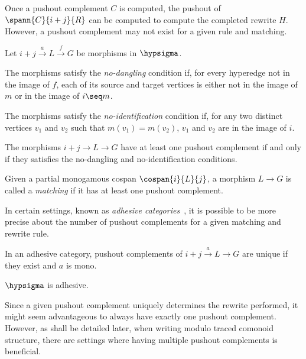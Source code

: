 Once a pushout complement \(C\) is computed, the pushout of
\(\spann{C}{i+j}{R}\) can be computed to compute the completed rewrite \(H\).
However, a pushout complement may not exist for a given rule and matching.

\begin{definition}
    Let \(i + j \xrightarrow{a} L \xrightarrow{f} G\) be morphisms in
    \(\hypsigma\).

    The morphisms satisfy the \emph{no-dangling} condition if, for every
    hyperedge not in the image of \(f\), each of its source and target vertices
    is either not in the image of \(m\) or in the image of \(i \seq m\).

    The morphisms satisfy the \emph{no-identification} condition if, for any two
    distinct vertices \(v_1\) and \(v_2\) such that \(m(v_1) = m(v_2)\), \(v_1\)
    and \(v_2\) are in the image of \(i\).
\end{definition}

\begin{proposition}
    \label{prop:pushout-complement}
    The morphisms \(i + j \to L \to G\) have at least one pushout complement if
    and only if they satisfies the no-dangling and no-identification conditions.
\end{proposition}

\begin{definition}
    Given a partial monogamous cospan \(\cospan{i}{L}{j}\), a morphism
    \(L \to G\) is called a \emph{matching} if it has at least one pushout
    complement.
\end{definition}

In certain settings, known as
\emph{adhesive categories}~\cite{lack2004adhesive}, it is possible to be more
precise about the number of pushout complements for a given matching and rewrite
rule.

\begin{proposition}
    In an adhesive category, pushout complements of \(
        i + j \xrightarrow{a} L \to G\)
    are unique if they exist and \(a\) is mono.
\end{proposition}

\begin{proposition}
    \(\hypsigma\) is adhesive.
\end{proposition}

Since a given pushout complement uniquely determines the rewrite performed, it
might seem advantageous to always have exactly one pushout complement.
However, as shall be detailed later, when writing modulo traced comonoid
structure, there are settings where having multiple pushout complements is
beneficial.

